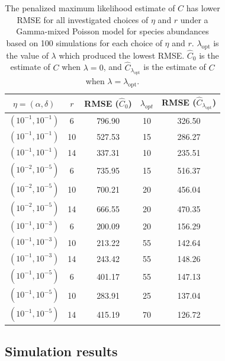 \documentclass[12pt]{article}
\theoremstyle{break}
\theoremstyle{break}
\begin{document}

\begin{table}[h]
\caption{The penalized maximum likelihood estimate of $C$ has lower RMSE for all investigated choices of $\eta$ and $r$ under a Gamma-mixed Poisson model for species abundances based on 100 simulations for each choice of $\eta$ and $r$.
$\lambda_{\text{opt}}$ is the value of $\lambda$ which produced the lowest RMSE.
$\widehat{C}_0$ is the estimate of $C$ when $\lambda = 0$, and $\widehat{C}_{\lambda_{\text{opt}}}$ is the estimate of $C$ when $\lambda = \lambda_{\text{opt}}$.
\label{tab:fixed_lambda_results}}
\centering
\begin{tabular}{ccccc}
  \hline
$\eta = (\alpha, \delta)$ & $r$ & RMSE ($\widehat{C}_{0}$) & $\lambda_{opt}$ & RMSE ($\widehat{C}_{\lambda_{ \text{opt}}}$) \\
  \hline
$\left(10^{-1}, 10^{-1}\right)$ &   6 & 796.90 &  10 & 326.50 \\
$\left(10^{-1}, 10^{-1}\right)$ &  10 & 527.53 &  15 & 286.27 \\
  $\left(10^{-1}, 10^{-1}\right)$ &  14 & 337.31 &  10 & 235.51 \\
  $\left(10^{-2}, 10^{-5}\right)$ &   6 & 735.95 &  15 & 516.37 \\
  $\left(10^{-2}, 10^{-5}\right)$ &  10 & 700.21 &  20 & 456.04 \\
  $\left(10^{-2}, 10^{-5}\right)$ &  14 & 666.55 &  20 & 470.35 \\
  $\left(10^{-1}, 10^{-3}\right)$ &   6 & 200.09 &  20 & 156.29 \\
  $\left(10^{-1}, 10^{-3}\right)$ &  10 & 213.22 &  55 & 142.64 \\
  $\left(10^{-1}, 10^{-3}\right)$ &  14 & 243.42 &  55 & 148.26 \\
  $\left(10^{-1}, 10^{-5}\right)$ &   6 & 401.17 &  55 & 147.13 \\
  $\left(10^{-1}, 10^{-5}\right)$ &  10 & 283.91 &  25 & 137.04 \\
  $\left(10^{-1}, 10^{-5}\right)$ &  14 & 415.19 &  70 & 126.72 \\
   \hline
\end{tabular}
\end{table}

\subsection{Simulation results} \label{sec:first_sim}
\end{document}
